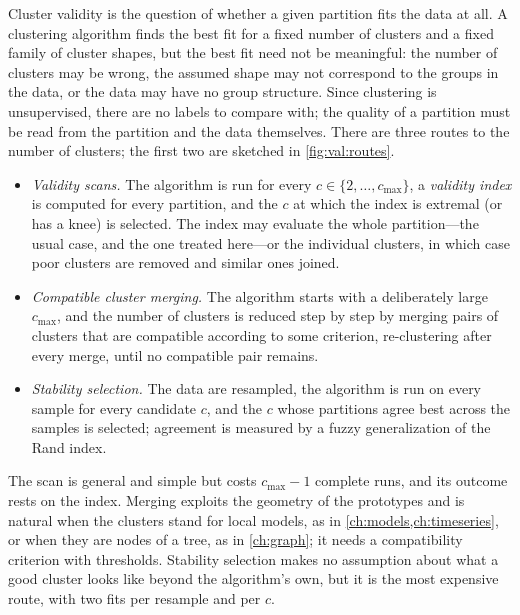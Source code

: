 Cluster validity is the question of whether a given partition fits the data at all. A clustering algorithm finds the best fit for a fixed number of clusters and a fixed family of cluster shapes, but the best fit need not be meaningful: the number of clusters may be wrong, the assumed shape may not correspond to the groups in the data, or the data may have no group structure. Since clustering is unsupervised, there are no labels to compare with; the quality of a partition must be read from the partition and the data themselves. There are three routes to the number of clusters; the first two are sketched in \cref{fig:val:routes}.
\begin{itemize}
  \item \emph{Validity scans.} The algorithm is run for every $c\in\{2,\dots,c_{\max}\}$, a \emph{validity index} is computed for every partition, and the $c$ at which the index is extremal (or has a knee) is selected. The index may evaluate the whole partition---the usual case, and the one treated here---or the individual clusters, in which case poor clusters are removed and similar ones joined.
  \item \emph{Compatible cluster merging.} The algorithm starts with a deliberately large $c_{\max}$, and the number of clusters is reduced step by step by merging pairs of clusters that are compatible according to some criterion, re-clustering after every merge, until no compatible pair remains.
  \item \emph{Stability selection.} The data are resampled, the algorithm is run on every sample for every candidate $c$, and the $c$ whose partitions agree best across the samples is selected; agreement is measured by a fuzzy generalization of the Rand index.
\end{itemize}
The scan is general and simple but costs $c_{\max}-1$ complete runs, and its outcome rests on the index. Merging exploits the geometry of the prototypes and is natural when the clusters stand for local models, as in \cref{ch:models,ch:timeseries}, or when they are nodes of a tree, as in \cref{ch:graph}; it needs a compatibility criterion with thresholds. Stability selection makes no assumption about what a good cluster looks like beyond the algorithm's own, but it is the most expensive route, with two fits per resample and per $c$.

